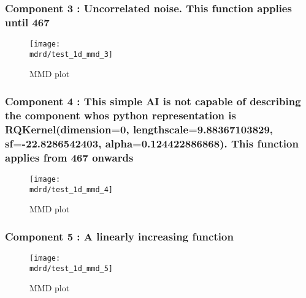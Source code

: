 \documentclass{article} %
\begin{document}
\subsubsection{Component 3 : Uncorrelated noise. This function applies until  467}

\begin{figure}[H]
\newcommand{\wmgd}{0.5\columnwidth}
\newcommand{\hmgd}{3.0cm}
\newcommand{\mdrd}{test_1d}
\newcommand{\mbm}{\hspace{-0.3cm}}
\texttt{[image: \\mdrd/test\_1d\_mmd\_3]}
\caption{
MMD plot}
\label{fig:mmd3}
\end{figure}

\subsubsection{Component 4 : This simple AI is not capable of describing the component whos python representation is RQKernel(dimension=0, lengthscale=9.88367103829, sf=-22.8286542403, alpha=0.124422886868). This function applies from  467 onwards}

\begin{figure}[H]
\newcommand{\wmgd}{0.5\columnwidth}
\newcommand{\hmgd}{3.0cm}
\newcommand{\mdrd}{test_1d}
\newcommand{\mbm}{\hspace{-0.3cm}}
\texttt{[image: \\mdrd/test\_1d\_mmd\_4]}
\caption{
MMD plot}
\label{fig:mmd4}
\end{figure}

\subsubsection{Component 5 : A linearly increasing function}

\begin{figure}[H]
\newcommand{\wmgd}{0.5\columnwidth}
\newcommand{\hmgd}{3.0cm}
\newcommand{\mdrd}{test_1d}
\newcommand{\mbm}{\hspace{-0.3cm}}
\texttt{[image: \\mdrd/test\_1d\_mmd\_5]}
\caption{
MMD plot}
\label{fig:mmd5}
\end{figure}
\end{document}
